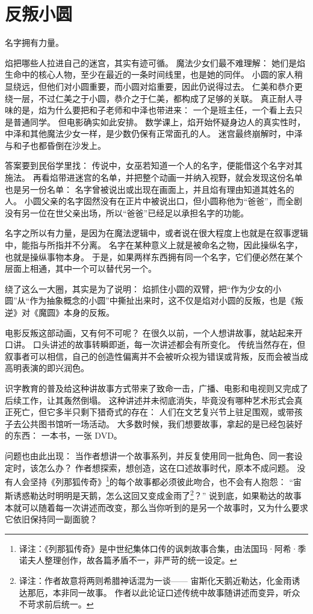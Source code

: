 \chapter{反叛小圆}
名字拥有力量。

焰把哪些人拉进自己的迷宫，其实有迹可循。
魔法少女们最不难理解：
她们是焰生命中的核心人物，至少在最近的一条时间线里，也是她的同伴。
小圆的家人稍显绕远，但他们对小圆重要，而小圆对焰重要，因此仍说得过去。
仁美和恭介更绕一层，不过仁美之于小圆，恭介之于仁美，都构成了足够的关联。
真正耐人寻味的是，焰为什么要把和子老师和中泽也带进来：
一个是班主任，一个看上去只是普通同学。
但电影确实如此安排。
数学课上，焰开始怀疑身边人的真实性时，中泽和其他魔法少女一样，是少数仍保有正常面孔的人。
迷宫最终崩解时，中泽与和子也都昏倒在沙发上。%

答案要到民俗学里找：
传说中，女巫若知道一个人的名字，便能借这个名字对其施法\cite{ref120}。
再看焰带进迷宫的名单，并把整个动画一并纳入视野，就会发现这份名单也是另一份名单：
名字曾被说出或出现在画面上，并且焰有理由知道其姓名的人。
小圆父亲的名字固然没有在正片中被说出口，但小圆称他为“爸爸”，而全剧没有另一位在世父亲出场，所以“爸爸”已经足以承担名字的功能。

名字之所以有力量，是因为在魔法逻辑中，或者说在很大程度上也就是在叙事逻辑中，能指与所指并不分离。
名字在某种意义上就是被命名之物，因此操纵名字，也就是操纵事物本身\cite{ref121}。
于是，如果两样东西拥有同一个名字，它们便必然在某个层面上相通，其中一个可以替代另一个。

绕了这么一大圈，其实是为了说明：
焰抓住小圆的双臂，把“作为少女的小圆”从“作为抽象概念的小圆”中撕扯出来时，这不仅是焰对小圆的反叛，也是《叛逆》对《魔圆》本身的反叛。

电影反叛这部动画，又有何不可呢？
在很久以前，一个人想讲故事，就站起来开口讲。
口头讲述的故事转瞬即逝，每一次讲述都会有所变化。
传统当然存在，但叙事者可以相信，自己的创造性偏离并不会被听众视为错误或背叛，反而会被当成高明表演的即兴润色。

识字教育的普及给这种讲故事方式带来了致命一击，广播、电影和电视则又完成了后续工作，让其轰然倒塌。
这种讲述并未彻底消失，毕竟没有哪种艺术形式会真正死亡，但它多半只剩下猎奇式的存在：
人们在文艺复兴节上驻足围观，或带孩子去公共图书馆听一场活动。
大多数时候，我们想要故事，拿起的是已经包装好的东西：
一本书，一张 DVD。

问题也由此出现：
当作者想讲一个故事系列，并反复使用同一批角色、同一套设定时，该怎么办？
作者想探索，想创造，这在口述故事时代，原本不成问题。
没有人会坚持《列那狐传奇》\footnote{%
    译注：《列那狐传奇》是中世纪集体口传的讽刺故事合集，由法国玛·阿希·季诺夫人整理创作，故各篇矛盾不一，非严苛的统一设定。
}的每个故事都必须彼此吻合，也不会有人抱怨：
“宙斯诱惑勒达时明明是天鹅，怎么这回又变成金雨了\footnote{%
    译注：作者故意将两则希腊神话混为一谈——
    宙斯化天鹅近勒达，化金雨诱达那厄，本非同一故事。
    作者以此论证口述传统中故事随讲述而变异，听众不苛求前后统一。
}？”
说到底，如果勒达的故事本就可以随着每一次讲述而改变，那么当你听到的是另一个故事时，又为什么要求它依旧保持同一副面貌？

